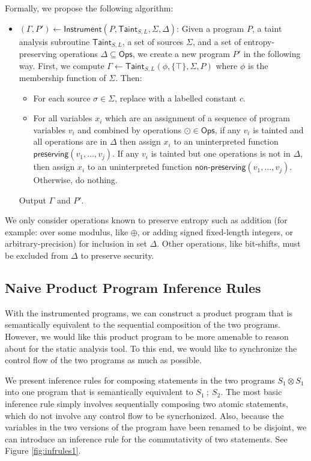 \documentclass[letterpaper,twocolumn,10pt]{article}
\newcommand{\cross}{\otimes{}}
\begin{document}
Formally, we propose the following algorithm:

\begin{itemize}
    \item $(\Gamma, P') \gets \mathsf{Instrument}(P, \mathsf{Taint}_{S,L}, \Sigma, \Delta)$: Given a program $P$, a taint analysis subroutine $\mathsf{Taint}_{S,L}$, a set
    of sources $\Sigma$, and a set of entropy-preserving operations $\Delta \subseteq \mathsf{Ops}$, we create a new program $P'$ in the following way. First,
    we compute $\Gamma \gets \mathsf{Taint}_{S,L}(\phi, \{\top\}, \Sigma, P)$ where $\phi$ is the membership function of $\Sigma$. Then:
    \begin{itemize}
        \item For each source $\sigma \in \Sigma$, replace with a labelled constant $c$.
        \item For all variables $x_i$ which are an assignment of a sequence of program variables $v_i$ and combined by operations $\odot \in \mathsf{Ops}$,
        if any $v_i$ is tainted and all operations are in $\Delta$ then assign $x_i$ to an uninterpreted function $\textsf{preserving}(v_1, \ldots, v_j)$. If
        any $v_i$ is tainted but one operations is not in $\Delta$, then assign $x_i$ to an uninterpreted function $\textsf{non-preserving}(v_1, \ldots, v_j)$.
        Otherwise, do nothing.
    \end{itemize}
    Output $\Gamma$ and $P'$.
\end{itemize}

We only consider operations known to preserve entropy such as addition (for example: over some modulus, like $\oplus$, or adding signed fixed-length integers, or arbitrary-precision) for inclusion in set $\Delta$.
Other operations, like bit-shifts, must be excluded from $\Delta$ to preserve security.

\subsection{Naive Product Program Inference Rules}

With the instrumented programs, we can construct a product program that is semantically equivalent to the sequential composition of the two programs. However, we would like this product program to be more amenable to reason about for the static analysis tool. To this end, we would like to synchronize the control flow of the two programs as much as possible. 

We present inference rules for composing statements in the two programs $S_1 \cross S_1$ into one program that is semantically equivalent to $S_1\ ;\ S_2$. The most basic inference rule simply involves sequentially composing two atomic statements, which do not involve any control flow to be syncrhonized. Also, because the variables in the two versions of the program have been renamed to be disjoint, we can introduce an inference rule for the commutativity of two statements. See Figure \ref{fig:infrules1}.
\end{document}

